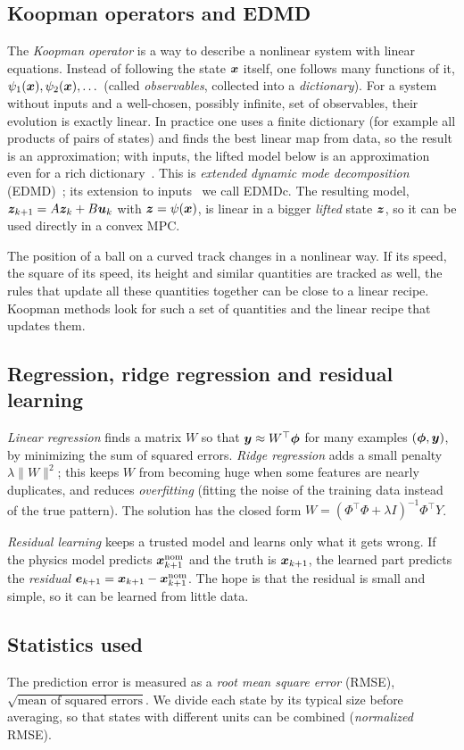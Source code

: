\subsection{Koopman operators and EDMD}
The \emph{Koopman operator} is a way to describe a nonlinear system with linear equations. Instead of following the state $\boldsymbol{x}$ itself, one follows many functions of it, $\psi_1(\boldsymbol{x}), \psi_2(\boldsymbol{x}),\dots$ (called \emph{observables}, collected into a \emph{dictionary}). For a system without inputs and a well-chosen, possibly infinite, set of observables, their evolution is exactly linear. In practice one uses a finite dictionary (for example all products of pairs of states) and finds the best linear map from data, so the result is an approximation; with inputs, the lifted model below is an approximation even for a rich dictionary~\cite{korda2018linear}. This is \emph{extended dynamic mode decomposition} (EDMD)~\cite{williams2015edmd}; its extension to inputs~\cite{korda2018linear} we call EDMDc. The resulting model, $\boldsymbol{z}_{k+1} = A\boldsymbol{z}_k + B\boldsymbol{u}_k$ with $\boldsymbol{z} = \psi(\boldsymbol{x})$, is linear in a bigger \emph{lifted} state $\boldsymbol{z}$, so it can be used directly in a convex MPC.

\begin{plain}
The position of a ball on a curved track changes in a nonlinear way. If its speed, the square of its speed, its height and similar quantities are tracked as well, the rules that update all these quantities together can be close to a linear recipe. Koopman methods look for such a set of quantities and the linear recipe that updates them.
\end{plain}

\subsection{Regression, ridge regression and residual learning}
\emph{Linear regression} finds a matrix $W$ so that $\boldsymbol{y}\approx W^\top\boldsymbol{\phi}$ for many examples $(\boldsymbol{\phi},\boldsymbol{y})$, by minimizing the sum of squared errors. \emph{Ridge regression} adds a small penalty $\lambda\|W\|^2$; this keeps $W$ from becoming huge when some features are nearly duplicates, and reduces \emph{overfitting} (fitting the noise of the training data instead of the true pattern). The solution has the closed form $W = (\Phi^\top\Phi + \lambda I)^{-1}\Phi^\top Y$.

\emph{Residual learning} keeps a trusted model and learns only what it gets wrong. If the physics model predicts $\boldsymbol{x}^{\text{nom}}_{k+1}$ and the truth is $\boldsymbol{x}_{k+1}$, the learned part predicts the \emph{residual} $\boldsymbol{e}_{k+1} = \boldsymbol{x}_{k+1} - \boldsymbol{x}^{\text{nom}}_{k+1}$. The hope is that the residual is small and simple, so it can be learned from little data.

\subsection{Statistics used}
The prediction error is measured as a \emph{root mean square error} (RMSE), $\sqrt{\text{mean of squared errors}}$. We divide each state by its typical size before averaging, so that states with different units can be combined (\emph{normalized} RMSE).
